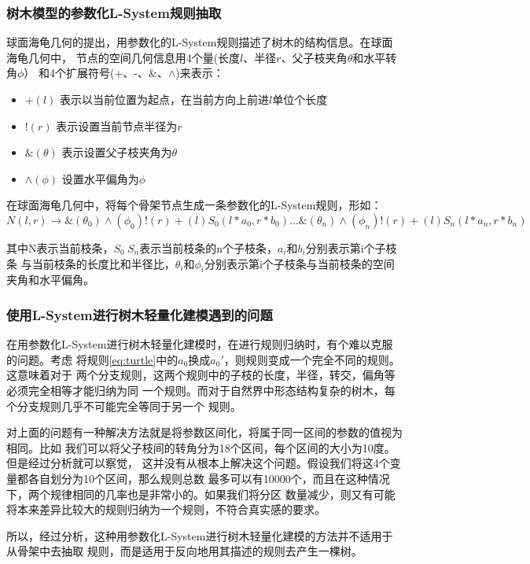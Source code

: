 \subsubsection{树木模型的参数化L-System规则抽取}
球面海龟几何的提出，用参数化的L-System规则描述了树木的结构信息。在球面海龟几何中，
节点的空间几何信息用4个量(长度$l$、半径$r$、父子枝夹角$\theta$和水平转角$\phi$）
和4个扩展符号(+、-、\&、$\wedge$)来表示：
\begin{itemize}
	\item $+(l)$	表示以当前位置为起点，在当前方向上前进$l$单位个长度
	\item $!(r)$	表示设置当前节点半径为$r$
	\item $\&(\theta)$	表示设置父子枝夹角为$\theta$
	\item $\wedge(\phi)$	设置水平偏角为$\phi$
\end{itemize}
在球面海龟几何中，将每个骨架节点生成一条参数化的L-System规则，形如：\\
\begin{equation} \label{eq:turtle}
N(l,r) \rightarrow \&(\theta_0)\wedge(\phi_0)!(r) + (l)S_0(l*a_0,r*b_0)...\&(\theta_n)\wedge(\phi_n)!(r) + (l)S_n(l*a_n,r*b_n)
\end{equation}

其中N表示当前枝条，$S_0~S_n$表示当前枝条的n个子枝条，$a_i和b_i$分别表示第i个子枝条
与当前枝条的长度比和半径比，$\theta_i和\phi_i$分别表示第i个子枝条与当前枝条的空间
夹角和水平偏角。

\subsubsection{使用L-System进行树木轻量化建模遇到的问题}
在用参数化L-System进行树木轻量化建模时，在进行规则归纳时，有个难以克服的问题。考虑
将规则\ref{eq:turtle}中的$a_0$换成$a_0'$，则规则变成一个完全不同的规则。这意味着对于
两个分支规则，这两个规则中的子枝的长度，半径，转交，偏角等必须完全相等才能归纳为同
一个规则。而对于自然界中形态结构复杂的树木，每个分支规则几乎不可能完全等同于另一个
规则。

对上面的问题有一种解决方法就是将参数区间化，将属于同一区间的参数的值视为相同。比如
我们可以将父子枝间的转角分为18个区间，每个区间的大小为10度。但是经过分析就可以察觉，
这并没有从根本上解决这个问题。假设我们将这4个变量都各自划分为10个区间，那么规则总数
最多可以有10000个，而且在这种情况下，两个规律相同的几率也是非常小的。如果我们将分区
数量减少，则又有可能将本来差异比较大的规则归纳为一个规则，不符合真实感的要求。

所以，经过分析，这种用参数化L-System进行树木轻量化建模的方法并不适用于从骨架中去抽取
规则，而是适用于反向地用其描述的规则去产生一棵树。


